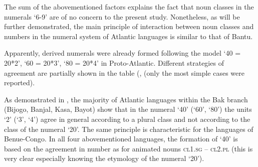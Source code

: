 The sum of the abovementioned factors explains the fact that noun classes in the numerals ‘6-9’ are of no concern to the present study. Nonetheless, as will be further demonstrated, the main principle of interaction between noun classes and numbers in the numeral system of Atlantic languages is similar to that of Bantu. 

Apparently, derived numerals were already formed following the model ‘40 = 20*2’, ‘60 = 20*3’, ‘80 = 20*4’ in Proto-Atlantic. Different strategies of agreement are partially shown in the table (, (only the most simple cases were reported).

\begin{table}

\caption{\label{tab:1:12} Atlantic languages: noun classes in the derived numerals}

\end{table}


As demonstrated in , the majority of Atlantic languages within the Bak branch (Bijogo, Banjal, Kasa, Bayot) show that in the numeral ‘40’ (‘60’, ‘80’) the units ‘2’ (‘3’, ‘4’) agree in general according to a plural class and not according to the class of the numeral ‘20’. The same principle is characteristic for the languages of Benue-Congo. In all four abovementioned languages, the formation of ‘40’ is based on the agreement in number as for animated nouns  \textsc{cl}1.\textsc{sg} – \textsc{cl}2.\textsc{pl} (this is very clear especially knowing the etymology of the numeral `20'). 

